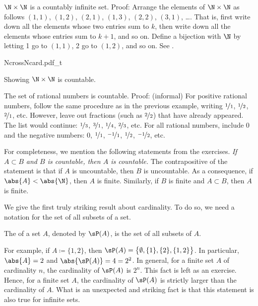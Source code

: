 \begin{example}
$\N \times \N$ is a countably infinite set.  Proof: Arrange the
elements of $\N \times \N$ as follows
$(1,1)$, $(1,2)$, $(2,1)$, $(1,3)$, $(2,2)$, $(3,1)$, \ldots.  That is,
first write down all the elements whose two entries sum to $k$,
then write down all the elements whose entries sum to $k+1$, and so on.
Define a bijection with $\N$ by letting 1 go to $(1,1)$,
2 go to $(1,2)$, and so on.  See .
\begin{myfigureht}
{NcrossNcard.pdf_t}
\caption{Showing $\N \times \N$ is countable.\label{fig:NcrossNcard}}
\end{myfigureht}
\end{example}

\begin{example}
The set of rational numbers is countable.  Proof: (informal)
For positive rational numbers, follow the same procedure
as in the previous example, writing
$\nicefrac{1}{1}$, $\nicefrac{1}{2}$, $\nicefrac{2}{1}$, etc.  However,
leave out fractions (such as $\nicefrac{2}{2}$)
that have already appeared.  The list would continue:
$\nicefrac{1}{3}$, $\nicefrac{3}{1}$, $\nicefrac{1}{4}$,
$\nicefrac{2}{3}$, etc.
For all rational numbers, include $0$ and the negative numbers:
$0$,
$\nicefrac{1}{1}$,
$\nicefrac{-1}{1}$,
$\nicefrac{1}{2}$,
$\nicefrac{-1}{2}$, etc.
\end{example}

For completeness, we mention the following statements
from the exercises.
\emph{If $A \subset
B$ and $B$ is countable, then $A$ is countable.}  The contrapositive of the
statement is that if $A$ is
uncountable, then $B$ is uncountable.
As a consequence, if $\abs{A} < \abs{\N}$, then $A$ is
finite.
Similarly, if $B$ is finite and $A \subset B$, then $A$ is finite.

\pagebreak[2]
We give the first truly striking result about cardinality.
To do so, we need a notation for
the set of all subsets of a set.

\begin{defn}
The \emph{} of a set $A$, denoted by $\sP(A)$,
 is the set of all subsets of $A$.
\end{defn}

For example, if $A \coloneqq \{ 1,2\}$,
then $\sP(A) = \bigl\{ \emptyset, \{ 1 \}, \{ 2 \}, \{ 1, 2 \} \bigr\}$.
In particular, $\abs{A} = 2$ and $\abs{\sP(A)} = 4 = 2^2$.
In general,
for a finite set $A$ of cardinality $n$, the
cardinality of $\sP(A)$ is $2^n$.
This fact is left as an exercise.  
Hence, for a finite set $A$,
the cardinality of $\sP(A)$ is strictly
larger than the
cardinality of $A$.  What is an unexpected and
striking fact is that this statement is also true for infinite sets.

